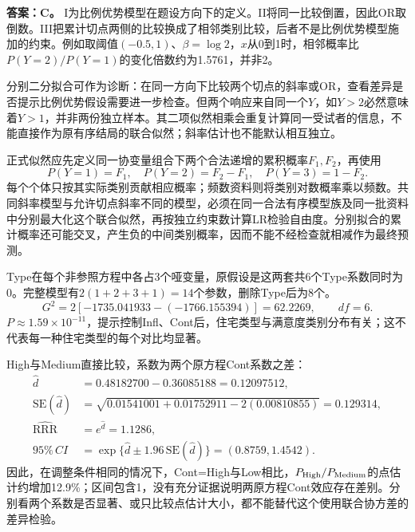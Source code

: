 \textbf{答案：C。} I为比例优势模型在题设方向下的定义。II将同一比较倒置，因此OR取倒数。III把累计切点两侧的比较换成了相邻类别比较，后者不是比例优势模型施加的约束。例如取阈值$(-0.5,1)$、$\beta=\log2$，$x$从0到1时，相邻概率比$P(Y=2)/P(Y=1)$的变化倍数约为1.5761，并非2。
\par\nobreak\smallskip{}

分别二分拟合可作为诊断：在同一方向下比较两个切点的斜率或OR，查看差异是否提示比例优势假设需要进一步检查。但两个响应来自同一个$Y$，如$Y>2$必然意味着$Y>1$，并非两份独立样本。其二项似然相乘会重复计算同一受试者的信息，不能直接作为原有序结局的联合似然；斜率估计也不能默认相互独立。\par 正式似然应先定义同一协变量组合下两个合法递增的累积概率$F_1,F_2$，再使用\[P(Y=1)=F_1,\quad P(Y=2)=F_2-F_1,\quad P(Y=3)=1-F_2.\]每个个体只按其实际类别贡献相应概率；频数资料则将类别对数概率乘以频数。共同斜率模型与允许切点斜率不同的模型，必须在同一合法有序模型族及同一批资料中分别最大化这个联合似然，再按独立约束数计算LR检验自由度。分别拟合的累计概率还可能交叉，产生负的中间类别概率，因而不能不经检查就相减作为最终预测。
\par\nobreak\smallskip{}

Type在每个非参照方程中各占3个哑变量，原假设是这两套共6个Type系数同时为0。完整模型有$2(1+2+3+1)=14$个参数，删除Type后为8个。\[G^2=2[-1735.041933-(-1766.155394)]=62.2269,\qquad df=6.\]$P\approx1.59\times10^{-11}$，提示控制Infl、Cont后，住宅类型与满意度类别分布有关；这不代表每一种住宅类型的每个对比均显著。\par High与Medium直接比较，系数为两个原方程Cont系数之差：\[\begin{aligned}\hat d&=0.48182700-0.36085188=0.12097512,\\\mathrm{SE}(\hat d)&=\sqrt{0.01541001+0.01752911-2(0.00810855)}=0.129314,\\\widehat{\mathrm{RRR}}&=e^{\hat d}=1.1286,\\95\%\,CI&=\exp\{\hat d\pm1.96\,\mathrm{SE}(\hat d)\}=(0.8759,1.4542).\end{aligned}\]因此，在调整条件相同的情况下，Cont=High与Low相比，$P_{\rm High}/P_{\rm Medium}$的点估计约增加12.9\%；区间包含1，没有充分证据说明两原方程Cont效应存在差别。分别看两个系数是否显著、或只比较点估计大小，都不能替代这个使用联合协方差的差异检验。
\par\nobreak\smallskip{}

